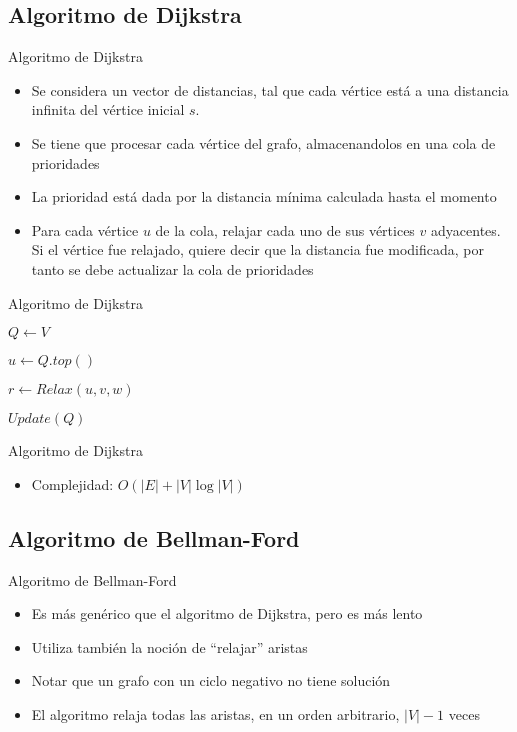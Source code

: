 \documentclass[handout]{beamer}
\begin{document}
\subsection{Algoritmo de Dijkstra}
\begin{frame}{Algoritmo de Dijkstra}
  \begin{itemize}
    \item Se considera un vector de distancias, tal que cada v\'ertice est\'a a una distancia infinita del v\'ertice inicial $s$.
      \pause
    \item Se tiene que procesar cada v\'ertice del grafo, almacenandolos en una cola de prioridades
      \pause
    \item La prioridad est\'a dada por la distancia m\'inima calculada hasta el momento
      \pause
    \item Para cada v\'ertice $u$ de la cola, relajar cada uno de sus v\'ertices $v$ adyacentes. Si el v\'ertice fue relajado, quiere decir que la distancia fue modificada, por tanto se debe actualizar la cola de prioridades
  \end{itemize}
\end{frame}

\begin{frame}{Algoritmo de Dijkstra}
  \begin{algorithm}[H]
    \BlankLine
    $Q \leftarrow V$ 
    {
      $u \leftarrow Q.top()$

      {
        $ r \leftarrow Relax(u, v, w) $

        {
          $Update(Q)$
        }
      }
    }

  \end{algorithm}
\end{frame}

\begin{frame}{Algoritmo de Dijkstra}
  \begin{itemize}
    \item Complejidad: $O(|E| + |V| \log |V|)$
  \end{itemize}
\end{frame}

\subsection{Algoritmo de Bellman-Ford}
\begin{frame}{Algoritmo de Bellman-Ford}
  \begin{itemize}
    \item Es m\'as gen\'erico que el algoritmo de Dijkstra, pero es m\'as lento
      \pause
    \item Utiliza tambi\'en la noci\'on de ``relajar'' aristas
      \pause
    \item Notar que un grafo con un ciclo negativo no tiene soluci\'on
      \pause
    \item El algoritmo relaja todas las aristas, en un orden arbitrario, $|V|-1$ veces
  \end{itemize}
\end{frame}
\end{document}

